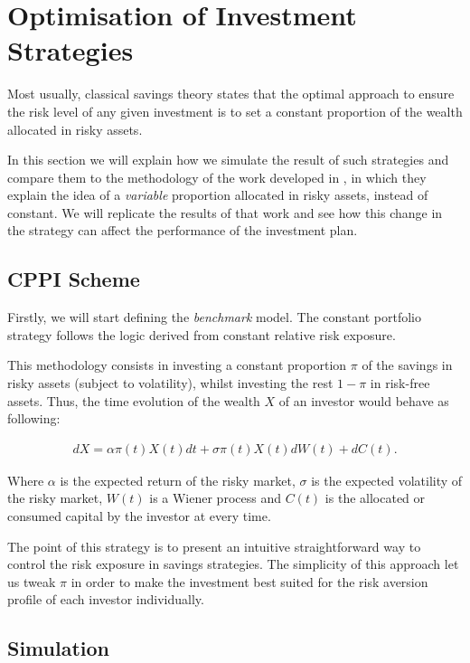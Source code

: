 \section{Optimisation of Investment Strategies}

Most usually, classical savings theory states that the optimal approach to ensure the risk level of any given investment is to set a constant proportion of the wealth allocated in risky assets.

In this section we will explain how we simulate the result of such strategies and compare them to the methodology of the work developed in \cite{a:guillen-optimisation}, in which they explain the idea of a \emph{variable} proportion allocated in risky assets, instead of constant. We will replicate the results of that work and see how this change in the strategy can affect the performance of the investment plan.

\subsection{CPPI Scheme}

Firstly, we will start defining the \textit{benchmark} model. The constant portfolio strategy follows the logic derived from constant relative risk exposure.

This methodology consists in investing a constant proportion $\pi$ of the savings in risky assets (subject to volatility), whilst investing the rest $1 - \pi$ in risk-free assets. Thus, the time evolution of the wealth $X$ of an investor would behave as following:

\begin{align}
	dX = \alpha \pi(t)X(t)dt + \sigma \pi(t)X(t)dW(t) + dC(t)\textit{.}
\end{align}

Where $\alpha$ is the expected return of the risky market, $\sigma$ is the expected volatility of the risky market, $W(t)$ is a Wiener process and $C(t)$ is the allocated or consumed capital by the investor at every time.

The point of this strategy is to present an intuitive straightforward way to control the risk exposure in savings strategies. The simplicity of this approach let us tweak $\pi$ in order to make the investment best suited for the risk aversion profile of each investor individually.

\subsection*{Simulation}

